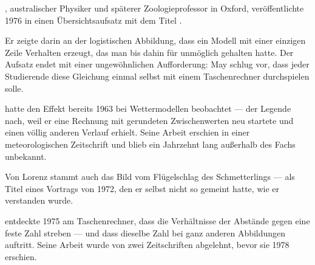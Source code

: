 \begin{geschichte}
, australischer Physiker und späterer Zoologieprofessor in Oxford, veröffentlichte 1976 in  einen Übersichtsaufsatz mit dem Titel .

Er zeigte darin an der logistischen Abbildung, dass ein Modell mit einer einzigen Zeile Verhalten erzeugt, das man bis dahin für unmöglich gehalten hatte. Der Aufsatz endet mit einer ungewöhnlichen Aufforderung: May schlug vor, dass jeder Studierende diese Gleichung einmal selbst mit einem Taschenrechner durchspielen solle.

\begin{center}
\begin{minipage}{0.9\textwidth}
\end{minipage}
\end{center}

 hatte den Effekt bereits 1963 bei Wettermodellen beobachtet --- der Legende nach, weil er eine Rechnung mit gerundeten Zwischenwerten neu startete und einen völlig anderen Verlauf erhielt. Seine Arbeit erschien in einer meteorologischen Zeitschrift und blieb ein Jahrzehnt lang außerhalb des Fachs unbekannt.

Von Lorenz stammt auch das Bild vom Flügelschlag des Schmetterlings --- als Titel eines Vortrags von 1972, den er selbst nicht so gemeint hatte, wie er verstanden wurde.

 entdeckte 1975 am Taschenrechner, dass die Verhältnisse der Abstände gegen eine feste Zahl streben --- und dass dieselbe Zahl bei ganz anderen Abbildungen auftritt. Seine Arbeit wurde von zwei Zeitschriften abgelehnt, bevor sie 1978 erschien.

\begin{center}
\begin{minipage}{0.9\textwidth}
\end{minipage}
\end{center}
\end{geschichte}

